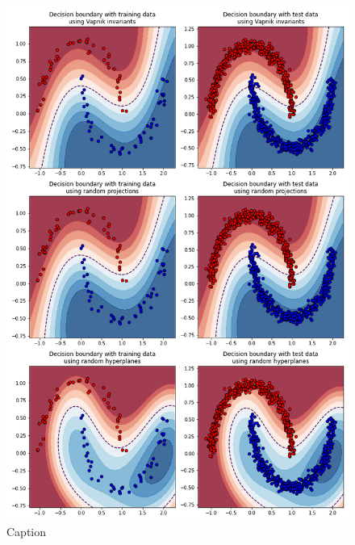 \begin{figure}
    \centering
    \includegraphics[width=\textwidth]{thesis/Figures/moons_decision_boundaries.png}
    \caption{Caption}
    \label{fig:moons_decision_boundary}
\end{figure}

